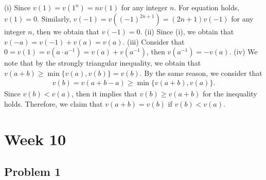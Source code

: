 \begin{solution}
    (i) Since $v(1) = v(1^n) = n v(1)$ for any integer $n$. For equation holds, $v(1)=0$. Similarly, $v(-1)=v((-1)^{2n+1}) = (2n+1)v(-1)$ for any integer $n$, then we obtain that $v(-1)=0$.
    (ii) Since (i), we obtain that $v(-a)=v(-1)+v(a) = v(a)$.
    (iii) Consider that $0=v(1)=v(a\cdot a^{-1})=v(a)+v(a^{-1})$, then $v(a^{-1})=-v(a)$.
    (iv) We note that by the strongly triangular inequality, we obtain that $v(a+b)\ge \min\{v(a),v(b)\}=v(b)$. By the same reason, we consider that 
    \begin{align*}
        v(b)=v(a+b-a)\ge \min\{v(a+b),v(a)\}.
    \end{align*}
    Since $v(b)<v(a)$, then it implies that $v(b)\ge v(a+b) $ for the inequality holds. Therefore, we claim that $v(a+b)=v(b)$ if $v(b)<v(a)$.
\end{solution}


\section{Week 10}
\subsection*{Problem 1}

